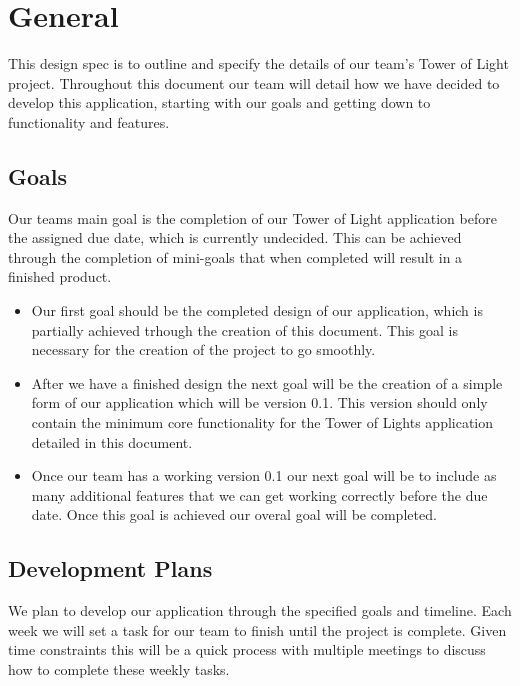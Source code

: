 \documentclass{article}
\begin{document}
\section{General}
This design spec is to outline and specify the details of our team's Tower of Light project. Throughout this document our team will detail how we have decided to develop this application, starting with our goals and getting down to functionality and features.
\subsection{Goals}
Our teams main goal is the completion of our Tower of Light application before the assigned due date, which is currently undecided. This can be achieved through the completion of mini-goals that when completed will result in a finished product.
	\begin{itemize}
		\item Our first goal should be the completed design of our application, which is partially achieved trhough the creation of this document. This goal is necessary for the creation of the 				project to go smoothly.
		\item After we have a finished design the next goal will be the creation of a simple form of our application which will be version 0.1. This version should only contain the minimum core 				functionality for the Tower of Lights application detailed in this document.
		\item Once our team has a working version 0.1 our next goal will be to include as many additional features that we can get working correctly before the due date. Once this goal is 					achieved our overal goal will be completed.
	\end{itemize}
\subsection{Development Plans}
We plan to develop our application through the specified goals and timeline. Each week we will set a task for our team to finish until the project is complete. Given time constraints this will be a quick process with multiple meetings to discuss how to complete these weekly tasks. 
\end{document}
